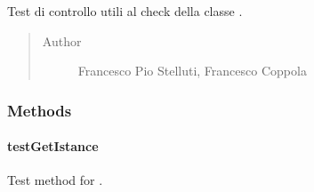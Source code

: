 \documentclass[letterpaper,10pt,italian,openany,oneside]{sphinxmanual}
\begin{document}
\begin{fulllineitems}
\label{\detokenize{test/it/unicam/cs/pa/mastermind/test/UIConsoleStartViewTest:it.unicam.cs.pa.mastermind.test.UIConsoleStartViewTest}}
Test di controllo utili al check della classe .
\begin{quote}\begin{description}
\item[{Author}] \leavevmode
Francesco Pio Stelluti, Francesco Coppola

\end{description}\end{quote}

\end{fulllineitems}



\subsubsection{Methods}
\label{\detokenize{test/it/unicam/cs/pa/mastermind/test/UIConsoleStartViewTest:methods}}

\paragraph{testGetIstance}
\label{\detokenize{test/it/unicam/cs/pa/mastermind/test/UIConsoleStartViewTest:testgetistance}}

\begin{fulllineitems}
\label{\detokenize{test/it/unicam/cs/pa/mastermind/test/UIConsoleStartViewTest:it.unicam.cs.pa.mastermind.test.UIConsoleStartViewTest.testGetIstance()}}
Test method for .

\end{fulllineitems}




\renewcommand{\indexname}{Indice}
\printindex
\end{document}
